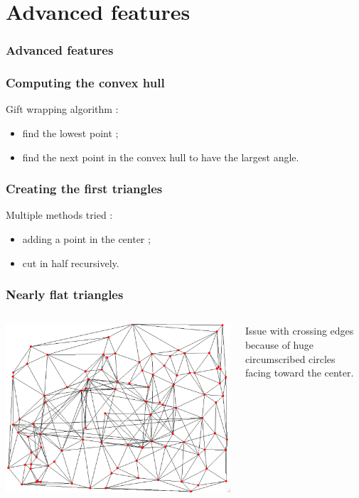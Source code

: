 \documentclass{beamer}
\begin{document}
	
	\section{Advanced features}
	\begin{frame}
		\frametitle{Advanced features}
		\tableofcontents[currentsection]
	\end{frame}
	
	\begin{frame}
		\frametitle{Computing the convex hull}
		Gift wrapping algorithm :
		\begin{itemize}
			\item find the lowest point ;
			\item find the next point in the convex hull to have the largest angle.
		\end{itemize}
	\end{frame}
	
	\begin{frame}
		\frametitle{Creating the first triangles}
		Multiple methods tried :
		\begin{itemize}
			\item adding a point in the center ;
			\item cut in half recursively.
		\end{itemize}
	\end{frame}
	
	\begin{frame}
		\frametitle{Nearly flat triangles}
		\begin{columns}[T]
			\begin{column}{.5\textwidth}
				\hspace*{0cm} \includegraphics[height=0.5\textheight]{convexhull-messedup-abit.png} \hspace*{\fill}
			\end{column}
			\begin{column}{.45\textwidth}
				Issue with crossing edges because of huge circumscribed circles facing toward the center.
			\end{column}
		\end{columns}
	\end{frame}
\end{document}
